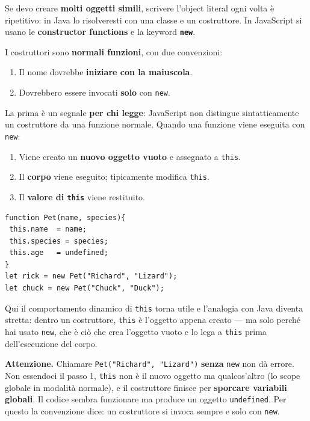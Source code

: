 \documentclass[10pt,a4paper]{article}
\newcommand{\avviso}[1]{\textbf{\textcolor{wamber}{Attenzione.}} #1}
\begin{document}
Se devo creare \textbf{molti oggetti simili}, scrivere l'object literal ogni volta è ripetitivo: in Java lo risolveresti con una classe e un costruttore. In JavaScript si usano le \textbf{constructor functions} e la keyword \textbf{\texttt{new}}.

I costruttori sono \textbf{normali funzioni}, con due convenzioni:

\begin{enumerate}
  \item Il nome dovrebbe \textbf{iniziare con la maiuscola}.
  \item Dovrebbero essere invocati \textbf{solo} con \texttt{new}.
\end{enumerate}

La prima è un segnale \textbf{per chi legge}: JavaScript non distingue sintatticamente un costruttore da una funzione normale. Quando una funzione viene eseguita con \texttt{new}:

\begin{enumerate}
  \item Viene creato un \textbf{nuovo oggetto vuoto} e assegnato a \texttt{this}.
  \item Il \textbf{corpo} viene eseguito; tipicamente modifica \texttt{this}.
  \item Il \textbf{valore di \texttt{this}} viene restituito.
\end{enumerate}

\begin{lstlisting}[style=js]
function Pet(name, species){
 this.name  = name;
 this.species = species;
 this.age   = undefined;
}
let rick = new Pet("Richard", "Lizard");
let chuck = new Pet("Chuck", "Duck");
\end{lstlisting}

Qui il comportamento dinamico di \texttt{this} torna utile e l'analogia con Java diventa stretta: dentro un costruttore, \texttt{this} è l'oggetto appena creato --- ma solo perché hai usato \texttt{new}, che è ciò che crea l'oggetto vuoto e lo lega a \texttt{this} prima dell'esecuzione del corpo.

\begin{warnbox}
\avviso{Chiamare \texttt{Pet("Richard", "Lizard")} \textbf{senza} \texttt{new} non dà errore. Non essendoci il passo 1, \texttt{this} non è il nuovo oggetto ma qualcos'altro (lo scope globale in modalità normale), e il costruttore finisce per \textbf{sporcare variabili globali}. Il codice sembra funzionare ma produce un oggetto \texttt{undefined}. Per questo la convenzione dice: un costruttore si invoca sempre e solo con \texttt{new}.}
\end{warnbox}
\end{document}
